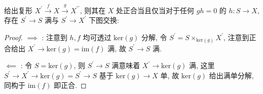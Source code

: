\begin{lemma}
    \label {lemma:universal property of exactness}
    给出复形 \(X^\prime \xrightarrow{f} X \xrightarrow{g} X^{\prime\prime}\), 则其在 \(X\) 处正合当且仅当对于任何 \(g h = 0\) 的 \(h : S \to X\),
    存在 \(S^\prime \to S\) 满与 \(S^\prime \to X^\prime\) 下图交换:

    \begin{center}
    \end{center}

    \begin{proof}
        \(\implies\) : 注意到 \(h,f\) 均可透过 \(\mathrm{ker} (g)\) 分解, 令 \(S^\prime = S \times_{\mathrm{ker}(g)} X^\prime\),
        注意到正合给出 \(X^\prime \to \mathrm{ker} (g) = \mathrm{im} (f)\) 满, 故 \(S^\prime \to S\) 满.

        \(\impliedby\) : 令 \(S = \mathrm{ker} (g)\), 则 \(S^\prime \to S\) 满意味着 \(X^\prime \to \mathrm{ker} (g)\) 满,
        这里 \(S^\prime \to X^\prime \to \mathrm{ker} (g) = S^\prime \to S\) 基于 \(\mathrm{ker} (g) \to X\) 单, 故 \(\mathrm{ker} (g)\) 给出满单分解, 同构于 \(\mathrm{im} (f)\) 即正合.
    \end{proof}
\end{lemma}

